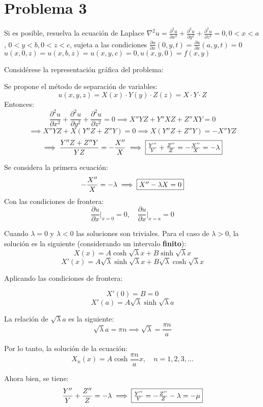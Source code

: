 \section{Problema 3}
Si es posible, resuelva la ecuación de Laplace $\nabla^{2} u=\frac{\partial^{2} u}{\partial x^{2}}+\frac{\partial^{2} u}{\partial y^{2}}+\frac{\partial^{2} u}{\partial z^{2}}=0,0<x<a$,
$0<y<b, 0<z<c$, sujeta a las condiciones $\frac{\partial u}{\partial x}(0, y, t)=\frac{\partial u}{\partial x}(a, y, t)=0$
$u(x, 0, z)=u(x, b, z)=u(x, y, c)=0, u(x, y, 0)=f(x, y)$

\begin{solution}
Considérese la representación gráfica del problema:


Se propone el método de separación de variables: 
$$u(x,y,z)=X(x)\cdot Y(y)\cdot Z(z) = X\cdot Y\cdot Z$$
Entonces: 
$$\frac{\partial^{2} u}{\partial x^{2}}+\frac{\partial^{2} u}{\partial y^{2}}+\frac{\partial^{2} u}{\partial z^{2}}=0\implies  X''YZ+ Y''XZ+Z''XY=0$$
$$\implies X''YZ+ X(Y''Z+Z''Y)=0 \implies X(Y''Z+Z''Y)= -X''YZ$$
\begin{align*}
    \implies \frac{Y''Z+Z''Y}{YZ}=-\frac{X''}{X} \implies\fbox{$\frac{Y''}{Y}+\frac{Z''}{Z}=-\frac{X''}{X}=-\lambda$}
\end{align*}

\linea 

Se considera la primera ecuación: 
$$-\frac{X''}{X}=-\lambda\implies \fbox{$X''-\lambda X=0$}$$
Con las condiciones de frontera: 
$$\frac{\partial u}{\partial x}\Big|_{x=0}=0,\quad \frac{\partial u}{\partial x}\Big|_{x=a}=0$$

Cuando $\lambda = 0$ y $\lambda<0$ las soluciones son triviales. Para el caso de $\lambda>0$, la solución es la siguiente (considerando un intervalo \textbf{finito}): 
$$X(x)= A\cosh \sqrt{\lambda}x+B\sinh\sqrt{\lambda}x$$
$$X'(x) = A\sqrt{\lambda}\sinh\sqrt{\lambda}x + B\sqrt{\lambda}\cosh\sqrt{\lambda}x  $$

Aplicando las condiciones de frontera: 

$$X'(0)= B = 0$$
$$X'(a)= A\sqrt{\lambda}\sinh \sqrt{\lambda}a$$

La relación de $\sqrt{\lambda}a$ es la siguiente: 
$$\sqrt{\lambda}a = \pi n\implies \sqrt{\lambda}=\frac{\pi n}{a}$$

Por lo tanto, la solución de la ecuación: 
$$X_n(x)= A\cosh \frac{\pi n}{a}x,\quad n=1,2,3,...$$

\linea 

Ahora bien, se tiene: $$\frac{Y''}{Y}+\frac{Z''}{Z}= -\lambda\implies \fbox{$\frac{Y''}{Y}= -\frac{Z''}{Z}-\lambda =-\mu$} $$


\end{solution}
